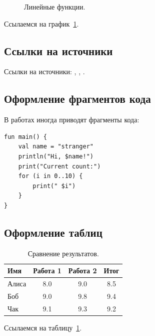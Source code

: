 \begin{figure}[ht]
\begin{center}

\caption{
\label{graph-fig}
     Линейные функции.}
\end {center}
\end {figure}
Ссылаемся на график~\ref{graph-fig}.

\subsection{Ссылки на источники}

Ссылки на источники: \cite{voc}, \cite{vo2}, \cite{ij-sdk}.

\subsection{Оформление фрагментов кода}

В работах иногда приводят фрагменты кода:

\begin{verbatim}
fun main() {
    val name = "stranger"
    println("Hi, $name!")
    print("Current count:")
    for (i in 0..10) {
        print(" $i")
    }
}
\end{verbatim}


\subsection{Оформление таблиц}


\begin{table}[ht]
\begin{center}
\begin{tabular}{lccc}
    Имя & Работа 1 & Работа 2 & Итог \\
\hline
    Алиса & 8.0 & 9.0 & 8.5 \\
    Боб & 9.0 & 9.8 & 9.4 \\
    Чак & 9.1 & 9.3 & 9.2 \\
\end{tabular}
\caption{
\label{table-smth}
     Сравнение результатов.}
\end {center}
\end {table}

Ссылаемся на таблицу~\ref{table-smth}.


